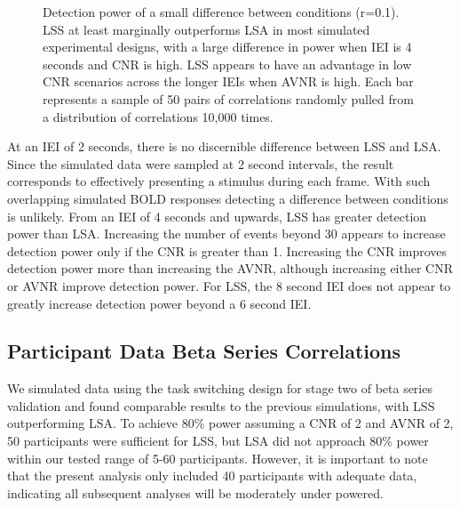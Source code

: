 \documentclass[phd,figures,tables,ackpage,abstractpage,publicabstractpage]{uithesis}
\begin{document}
\begin{figure}[H]
  \centering


  \caption[Simulation results for LSA/LSS]{
    Detection power of a small difference between conditions (r=0.1).
    LSS at least marginally outperforms LSA in most simulated experimental
    designs, with a large difference in power when IEI is 4 seconds and
    CNR is high.
    LSS appears to have an advantage in low CNR scenarios across the longer IEIs
    when AVNR is high.
    Each bar represents a sample of 50 pairs of correlations
    randomly pulled from a distribution of correlations 10,000 times.
  }
  \label{fig:res_sim_smalldiff}
\end{figure}

At an IEI of 2 seconds, there is no discernible difference between LSS and LSA.
Since the simulated data were sampled at 2 second intervals, the result
corresponds to effectively presenting a stimulus during each frame.
With such overlapping simulated BOLD responses detecting a difference between conditions
is unlikely.
From an IEI of 4 seconds and upwards, LSS has greater detection power than LSA.
Increasing the number of events beyond 30 appears to increase detection power only if the CNR is greater than 1.
Increasing the CNR improves detection power more than increasing the AVNR, although increasing either
CNR or AVNR improve detection power.
For LSS, the 8 second IEI does not appear to greatly increase detection power beyond a 6 second IEI.

\subsection{Participant Data Beta Series Correlations}
\label{results:bsc-taskswitch}

We simulated data using the task switching design for stage two of beta series
validation and found comparable
results to the previous simulations, with LSS outperforming LSA.
To achieve 80\% power assuming a CNR of 2 and AVNR of 2, 50 participants were sufficient for LSS, but LSA
did not approach 80\% power within our tested range of 5-60 participants.
However, it is important to note that the present analysis only included 40 participants with adequate data,
indicating all subsequent analyses will be moderately under powered.
\end{document}
